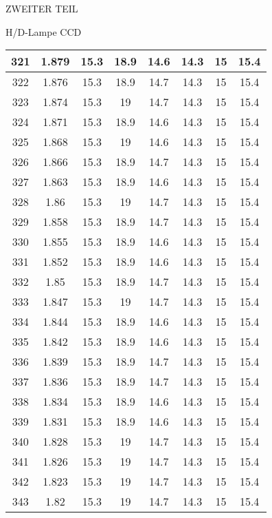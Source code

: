 \begin{appendix}
\begin{chapter}{ZWEITER TEIL}
\begin{section}{H/D-Lampe CCD}
\begin{scriptsize}
\begin{longtable}[htbp]{|c|c|c|c|c|c|c|c|}
            321 & 1.879 & 15.3 & 18.9 & 14.6 & 14.3 & 15 & 15.4 \\ \hline
            322 & 1.876 & 15.3 & 18.9 & 14.7 & 14.3 & 15 & 15.4 \\ \hline
            323 & 1.874 & 15.3 & 19 & 14.7 & 14.3 & 15 & 15.4 \\ \hline
            324 & 1.871 & 15.3 & 18.9 & 14.6 & 14.3 & 15 & 15.4 \\ \hline
            325 & 1.868 & 15.3 & 19 & 14.6 & 14.3 & 15 & 15.4 \\ \hline
            326 & 1.866 & 15.3 & 18.9 & 14.7 & 14.3 & 15 & 15.4 \\ \hline
            327 & 1.863 & 15.3 & 18.9 & 14.6 & 14.3 & 15 & 15.4 \\ \hline
            328 & 1.86 & 15.3 & 19 & 14.7 & 14.3 & 15 & 15.4 \\ \hline
            329 & 1.858 & 15.3 & 18.9 & 14.7 & 14.3 & 15 & 15.4 \\ \hline
            330 & 1.855 & 15.3 & 18.9 & 14.6 & 14.3 & 15 & 15.4 \\ \hline
            331 & 1.852 & 15.3 & 18.9 & 14.6 & 14.3 & 15 & 15.4 \\ \hline
            332 & 1.85 & 15.3 & 18.9 & 14.7 & 14.3 & 15 & 15.4 \\ \hline
            333 & 1.847 & 15.3 & 19 & 14.7 & 14.3 & 15 & 15.4 \\ \hline
            334 & 1.844 & 15.3 & 18.9 & 14.6 & 14.3 & 15 & 15.4 \\ \hline
            335 & 1.842 & 15.3 & 18.9 & 14.6 & 14.3 & 15 & 15.4 \\ \hline
            336 & 1.839 & 15.3 & 18.9 & 14.7 & 14.3 & 15 & 15.4 \\ \hline
            337 & 1.836 & 15.3 & 18.9 & 14.7 & 14.3 & 15 & 15.4 \\ \hline
            338 & 1.834 & 15.3 & 18.9 & 14.6 & 14.3 & 15 & 15.4 \\ \hline
            339 & 1.831 & 15.3 & 18.9 & 14.6 & 14.3 & 15 & 15.4 \\ \hline
            340 & 1.828 & 15.3 & 19 & 14.7 & 14.3 & 15 & 15.4 \\ \hline
            341 & 1.826 & 15.3 & 19 & 14.7 & 14.3 & 15 & 15.4 \\ \hline
            342 & 1.823 & 15.3 & 19 & 14.7 & 14.3 & 15 & 15.4 \\ \hline
            343 & 1.82 & 15.3 & 19 & 14.7 & 14.3 & 15 & 15.4 \\ \hline

\end{longtable}
\end{scriptsize}
\end{section}
\end{chapter}
\end{appendix}

